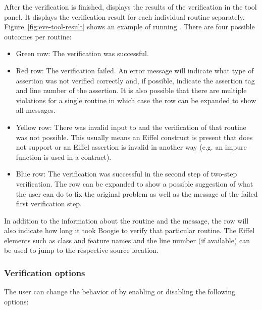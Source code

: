 After the verification is finished, \AutoProof displays the results of the verification in the tool panel. It displays the verification result for each individual routine separately. Figure~\ref{fig:eve-tool-result} shows an example of running \AutoProof. There are four possible outcomes per routine:
\begin{itemize}
\item \colorbox[HTML]{CCFFCC}{Green row:} The verification was successful.
\item \colorbox[HTML]{FFBBBB}{Red row:} The verification failed. An error message will indicate what type of assertion was not verified correctly and, if possible, indicate the assertion tag and line number of the assertion. It is also possible that there are multiple violations for a single routine in which case the row can be expanded to show all messages.
\item \colorbox[HTML]{FFFF66}{Yellow row:} There was invalid input to \AutoProof and the verification of that routine was not possible. This usually means an Eiffel construct is present that \AutoProof does not support or an Eiffel assertion is invalid in another way (e.g. an impure function is used in a contract).
\item \colorbox[HTML]{DDEEFF}{Blue row:} The verification was successful in the second step of two-step verification. The row can be expanded to show a possible suggestion of what the user can do to fix the original problem as well as the message of the failed first verification step.
\end{itemize}

In addition to the information about the routine and the message, the row will also indicate how long it took Boogie to verify that particular routine. The Eiffel elements such as class and feature names and the line number (if available) can be used to jump to the respective source location.

\subsubsection{Verification options}

The user can change the behavior of \AutoProof by enabling or disabling the following options:

